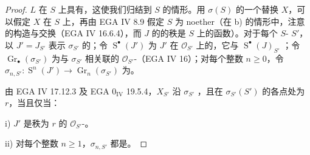 \begin{proof}
 $L$ 在 $S$ 上具有，这使我们归结到 $S$ 的情形。用 $\sigma(S)$ 的一个替换 $X$，可以假定 $X$ 在 $S$ 上，再由 EGA IV 8.9 假定 $S$ 为 noether（在 b) 的情形中，注意的构造与交换（EGA IV 16.6.4），而 $J$ 的的秩是 $S$ 上的函数）。对于每个 $S$- $S'$，以 $J'=J_{S'}$ 表示 $\sigma_{S'}$ 的；令 $\operatorname S^{\bullet}(J')$ 为 $J'$ 在 $\mathcal O_{S'}$ 上的，它与 $\operatorname S^{\bullet}(J)_{S'}$ ；令 $\operatorname{Gr}_{\bullet}(\sigma_{S'})$ 为与 $\sigma_{S'}$ 相关联的 $\mathcal O_{S'}$-（EGA IV 16）；对每个整数 $n\geq0$，令 $\sigma_{n,S'}:\operatorname S^n(J')\to\operatorname{Gr}_n(\sigma_{S'})$ 为。

由 EGA IV 17.12.3 及 EGA 0$_{\mathrm{IV}}$ 19.5.4，$X_{S'}$ 沿 $\sigma_{S'}$ ，且在 $\sigma_{S'}(S')$ 的各点处为 $r$，当且仅当：

i) $J'$ 是秩为 $r$ 的 $\mathcal O_{S'}$-。

ii) 对每个整数 $n\geq1$，$\sigma_{n,S'}$ 都是。


\end{proof}
